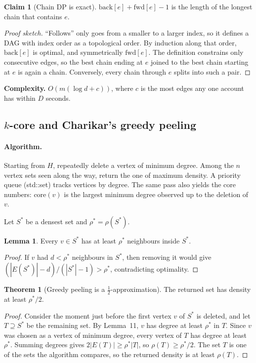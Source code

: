 \documentclass[11pt,a4paper]{article}
\theoremstyle{definition}
\newtheorem{theorem}[definition]{Theorem}
\newtheorem{lemma}[definition]{Lemma}
\newtheorem{claim}[definition]{Claim}
\begin{document}
\begin{claim}[Chain DP is exact]
$\text{back}[e] + \text{fwd}[e] - 1$ is the length of the longest chain that contains $e$.
\end{claim}

\begin{proof}[Proof sketch]
``Follows'' only goes from a smaller to a larger index, so it defines a DAG with index order as a topological order. By induction along that order, $\text{back}[e]$ is optimal, and symmetrically $\text{fwd}[e]$. The definition constrains only consecutive edges, so the best chain ending at $e$ joined to the best chain starting at $e$ is again a chain. Conversely, every chain through $e$ splits into such a pair.
\end{proof}

\noindent\textbf{Complexity.} $O(m(\log d + c))$, where $c$ is the most edges any one account has within $D$ seconds.

\subsection{$k$-core and Charikar's greedy peeling}
\paragraph{Algorithm.} Starting from $H$, repeatedly delete a vertex of minimum degree. Among the $n$ vertex sets seen along the way, return the one of maximum density. A priority queue (std::set) tracks vertices by degree. The same pass also yields the core numbers: $\text{core}(v)$ is the largest minimum degree observed up to the deletion of $v$.

Let $S^*$ be a densest set and $\rho^* = \rho(S^*)$.

\begin{lemma}
Every $v \in S^*$ has at least $\rho^*$ neighbours inside $S^*$.
\end{lemma}

\begin{proof}
If $v$ had $d < \rho^*$ neighbours in $S^*$, then removing it would give $(|E(S^*)| - d)/(|S^*| - 1) > \rho^*$, contradicting optimality.
\end{proof}

\begin{theorem}[Greedy peeling is a $\frac{1}{2}$-approximation]
The returned set has density at least $\rho^*/2$.
\end{theorem}

\begin{proof}
Consider the moment just before the first vertex $v$ of $S^*$ is deleted, and let $T \supseteq S^*$ be the remaining set. By Lemma~11, $v$ has degree at least $\rho^*$ in $T$. Since $v$ was chosen as a vertex of minimum degree, every vertex of $T$ has degree at least $\rho^*$. Summing degrees gives $2|E(T)| \ge \rho^* |T|$, so $\rho(T) \ge \rho^*/2$. The set $T$ is one of the sets the algorithm compares, so the returned density is at least $\rho(T)$.
\end{proof}
\end{document}
